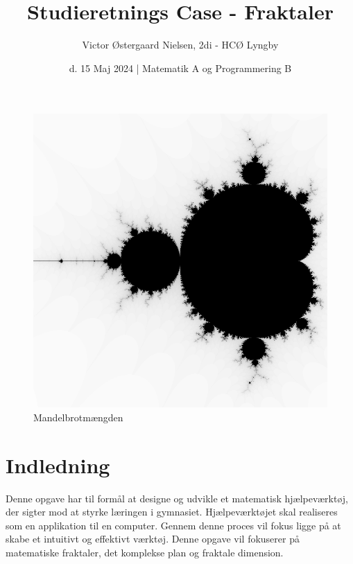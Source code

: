 \documentclass{article}
\title{Studieretnings Case - Fraktaler}
\author{Victor Østergaard Nielsen, 2di - HCØ Lyngby}
\date{d. 15 Maj 2024 | Matematik A og Programmering B}
\begin{document}
\maketitle

\section*{}
\begin{figure}[!h]
    \centering
    \includegraphics[width=0.7\linewidth]{fractal1.png}
    \caption{Mandelbrotmængden}
    \label{mandelbrotmængden}
\end{figure}

\newpage
\tableofcontents
\newpage
\section{Indledning}
Denne opgave har til formål at designe og udvikle et matematisk hjælpeværktøj, der sigter mod at styrke læringen i gymnasiet. Hjælpeværktøjet skal realiseres som en applikation til en computer. Gennem denne proces vil fokus ligge på at skabe et intuitivt og effektivt værktøj. Denne opgave vil fokuserer på matematiske fraktaler, det komplekse plan og fraktale dimension. 
\newpage
\end{document}
